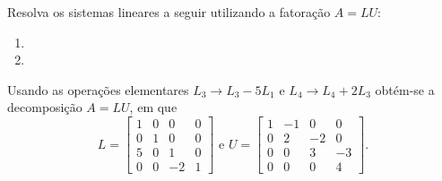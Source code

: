 \documentclass[12pt,a4paper]{article}
\begin{document}
\begin{ExerciseList}
\Exercise[title={2,5}]
Resolva os sistemas lineares a seguir utilizando a fatoração $A = LU$:
\begin{multicols}{2}
\begin{enumerate}
\item {}
\item {}
\end{enumerate}
\end{multicols}
\Answer Usando as operações elementares $L_3 \to L_3 - 5L_1$ e $L_4 \to L_4 + 2L_3$ obtém-se a decomposição $A = LU$, em que
\[
L=
\begin{bmatrix}
1 & 0 &  0 & 0\\
0 & 1 &  0 & 0\\
5 & 0 &  1 & 0\\
0 & 0 & -2 & 1
\end{bmatrix}
\text{ e }
U=\begin{bmatrix}
1 & -1 &  0 &  0\\
0 &  2 & -2 &  0\\
0 &  0 &  3 & -3\\
0 &  0 &  0 &  4
\end{bmatrix}.
\]


\end{ExerciseList}
\end{document}
